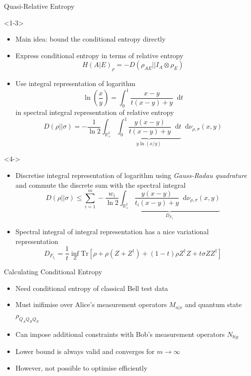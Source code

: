 \documentclass[xcolor=dvipsnames]{beamer}
\newcommand{\?}{\mathrel{?}} %
\newcommand{\dif}{\mathop{}\!\mathrm{d}} %
\newcommand{\R}{\mathbb{R}} %
\newcommand{\Tr}{\mathrm{Tr}} %
\begin{document}
\begin{frame}{Quasi-Relative Entropy}
  \begin{onlyenv}<1-3>
  \begin{itemize}[<+->]
    \item Main idea: bound the conditional entropy directly
    \item Express conditional entropy in terms of relative entropy
      \[ H{(A|E)}_{\rho} = -D(\rho_{AE}||I_A \otimes \rho_{E}) \]
    \item Use integral representation of logarithm
      \[ \ln\left(\frac{x}{y}\right) = \int_{0}^{1} \frac{x-y}{t(x-y) + y} \dif{t} \]
      in spectral integral representation of relative entropy
      \[ D(\rho||\sigma) = -\frac{1}{\ln 2} \int_{\R^{2}_{+}} \underbrace{\int_{0}^{1} \frac{y(x-y)}{t(x-y)+y} \dif{t}}_{y\ln(x/y)} \dif{\nu_{\rho,\sigma}(x,y)} \]
  \end{itemize}
  \end{onlyenv}

  \begin{onlyenv}<4->
  \begin{itemize}[<+->]
    \item Discretise integral representation of logarithm using \emph{Gauss-Radau quadrature} and commute the discrete sum with the spectral integral
      \[ D(\rho||\sigma) \leq \sum_{i=1}^m -\frac{w_i}{\ln 2} \underbrace{\int_{\R^{2}_{+}} \frac{y(x-y)}{t_i(x-y)+y} \dif{\nu_{\rho,\sigma}(x,y)}}_{D_{F_{t_i}}} \]
    \item Spectral integral of integral representation has a nice variational representation
      \[ D_{F_{t_i}} = \frac{1}{t}  \inf_Z \Tr\left[ \rho + \rho(Z + Z^{\dagger}) + (1-t)\rho{}Z^{\dagger}Z + t\sigma{}ZZ^{\dagger} \right]\]
  \end{itemize}
  \end{onlyenv}
\end{frame}


\begin{frame}{Calculating Conditional Entropy}
  \begin{itemize}[<+->]
    \item Need conditional entropy of classical Bell test data
    \item Must inifimise over Alice's measurement operators \(M_{a|x}\) and quantum state \(\rho_{Q_A Q_B Q_E}\)
    \item Can impose additional constraints with Bob's measurement operators \(N_{b|y}\)
    \item Lower bound is always valid and converges for \(m\to\infty\)
    \item However, not possible to optimise efficiently
  \end{itemize}
\end{frame}
\end{document}
